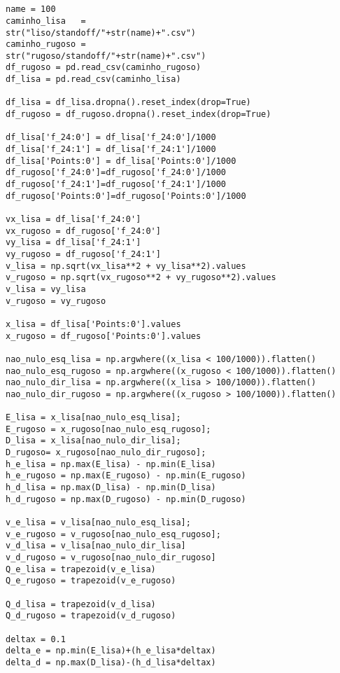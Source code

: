 \section*{}

\begin{lstlisting}[title=\phantom{}]
name = 100
caminho_lisa   =
str("liso/standoff/"+str(name)+".csv")
caminho_rugoso =
str("rugoso/standoff/"+str(name)+".csv")
df_rugoso = pd.read_csv(caminho_rugoso)
df_lisa = pd.read_csv(caminho_lisa)

df_lisa = df_lisa.dropna().reset_index(drop=True)
df_rugoso = df_rugoso.dropna().reset_index(drop=True)

df_lisa['f_24:0'] = df_lisa['f_24:0']/1000
df_lisa['f_24:1'] = df_lisa['f_24:1']/1000
df_lisa['Points:0'] = df_lisa['Points:0']/1000
df_rugoso['f_24:0']=df_rugoso['f_24:0']/1000
df_rugoso['f_24:1']=df_rugoso['f_24:1']/1000
df_rugoso['Points:0']=df_rugoso['Points:0']/1000

vx_lisa = df_lisa['f_24:0']
vx_rugoso = df_rugoso['f_24:0']
vy_lisa = df_lisa['f_24:1']
vy_rugoso = df_rugoso['f_24:1']
v_lisa = np.sqrt(vx_lisa**2 + vy_lisa**2).values
v_rugoso = np.sqrt(vx_rugoso**2 + vy_rugoso**2).values
v_lisa = vy_lisa
v_rugoso = vy_rugoso

x_lisa = df_lisa['Points:0'].values
x_rugoso = df_rugoso['Points:0'].values

nao_nulo_esq_lisa = np.argwhere((x_lisa < 100/1000)).flatten()
nao_nulo_esq_rugoso = np.argwhere((x_rugoso < 100/1000)).flatten()
nao_nulo_dir_lisa = np.argwhere((x_lisa > 100/1000)).flatten()
nao_nulo_dir_rugoso = np.argwhere((x_rugoso > 100/1000)).flatten()

E_lisa = x_lisa[nao_nulo_esq_lisa]; 
E_rugoso = x_rugoso[nao_nulo_esq_rugoso]; 
D_lisa = x_lisa[nao_nulo_dir_lisa];
D_rugoso= x_rugoso[nao_nulo_dir_rugoso];
h_e_lisa = np.max(E_lisa) - np.min(E_lisa)
h_e_rugoso = np.max(E_rugoso) - np.min(E_rugoso)
h_d_lisa = np.max(D_lisa) - np.min(D_lisa)
h_d_rugoso = np.max(D_rugoso) - np.min(D_rugoso)

v_e_lisa = v_lisa[nao_nulo_esq_lisa]; 
v_e_rugoso = v_rugoso[nao_nulo_esq_rugoso]; 
v_d_lisa = v_lisa[nao_nulo_dir_lisa]
v_d_rugoso = v_rugoso[nao_nulo_dir_rugoso]
Q_e_lisa = trapezoid(v_e_lisa)
Q_e_rugoso = trapezoid(v_e_rugoso)

Q_d_lisa = trapezoid(v_d_lisa)
Q_d_rugoso = trapezoid(v_d_rugoso)

deltax = 0.1
delta_e = np.min(E_lisa)+(h_e_lisa*deltax)
delta_d = np.max(D_lisa)-(h_d_lisa*deltax)


\end{lstlisting}
